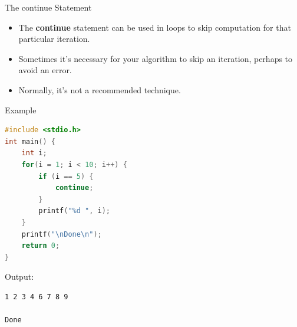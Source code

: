 \documentclass[graphics]{beamer}
\begin{document}
\begin{frame}{The continue Statement}
    \begin{itemize}
        \item The \textbf{continue} statement can be used in loops to skip computation for that particular iteration.
        \item Sometimes it's necessary for your algorithm to skip an iteration, perhaps to avoid an error.
        \item Normally, it's not a recommended technique.
    \end{itemize}
\end{frame}

\begin{frame}[fragile]{Example}
    \begin{lstlisting}[language=C,basicstyle=\footnotesize,keywordstyle=\color{blue},commentstyle=\color{green},showstringspaces=false,stringstyle=\color{red}]
#include <stdio.h>
int main() {
    int i;
    for(i = 1; i < 10; i++) {
        if (i == 5) {
            continue;
        }
        printf("%d ", i);
    }
    printf("\nDone\n");
    return 0;
}
    \end{lstlisting}
    Output:
    \begin{verbatim}
1 2 3 4 6 7 8 9

Done
    \end{verbatim}
\end{frame}
\end{document}
